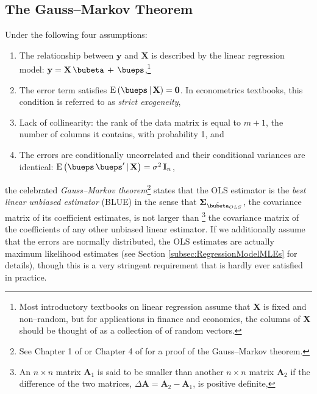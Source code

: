 \documentclass[graybox,envcountchap,sectrefs]{svmono}\usepackage[]{graphicx}\usepackage[]{xcolor}
\begin{document}
\begin{appendices}
\subsection{The Gauss--Markov Theorem\label{subsec:GaussMarkovTheorem}}

Under the following four assumptions:
\begin{enumerate}
\item The relationship between $\mathrm{\mathbf{y}}$ and $\mathrm{\mathbf{X}}$
is described by the linear regression model: $\mathrm{\mathbf{y}}=\mathrm{\mathbf{X}}\,\bubeta\,+\,\bueps$,\footnote{Most introductory textbooks on linear regression assume that $\mathrm{\mathbf{X}}$
is fixed and non--random, but for applications in finance and economics,
the columns of $\mathrm{\mathbf{X}}$ should be thought of as a collection
of of random vectors.}
\item The error term satisfies $\mathrm{E}\left(\bueps\,|\,\mathrm{\mathbf{X}}\right)=\mathbf{0}$.
In econometrics textbooks, this condition is referred to as \emph{strict
exogeneity},
\item Lack of collinearity: the rank of the data matrix is equal to $m+1$,
the number of columns it contains, with probability 1, and
\item The  errors are conditionally uncorrelated and their conditional
variances are identical: $\mathrm{E}\left(\bueps\,\bueps^{\prime}\,|\,\mathrm{\mathbf{X}}\right)=\sigma^{2}\,\mathrm{\mathbf{I}}_{n}$,
\end{enumerate}
the celebrated \emph{Gauss--Markov theorem}\footnote{See Chapter 1 of \citet{Hayashi2000} or Chapter 4 of \citet{Greene2018}
for a proof of the Gauss--Markov theorem.} states that the OLS estimator is the \emph{best linear unbiased estimator}
(BLUE) in the sense that $\mathbf{\Sigma}_{\hat{\bubeta}_{OLS}}$,
the covariance matrix of its coefficient estimates, is not larger
than \footnote{An $n\times n$ matrix $\mathrm{\mathbf{A}}_{1}$ is said to be smaller
than another $n\times n$ matrix $\mathrm{\mathbf{A}}_{2}$ if the
difference of the two matrices, $\Delta\mathrm{\mathbf{A}}=\mathrm{\mathbf{A}}_{2}-\mathrm{\mathbf{A}}_{1}$,
is positive definite,} the covariance matrix of the coefficients of any other unbiased linear
estimator. If we additionally assume that the errors are normally
distributed, the OLS estimates are actually maximum likelihood estimates
(see Section \ref{subsec:RegressionModelMLEs} for details), though
this is a very stringent requirement that is hardly ever satisfied
in practice.


\end{appendices}
\end{document}
